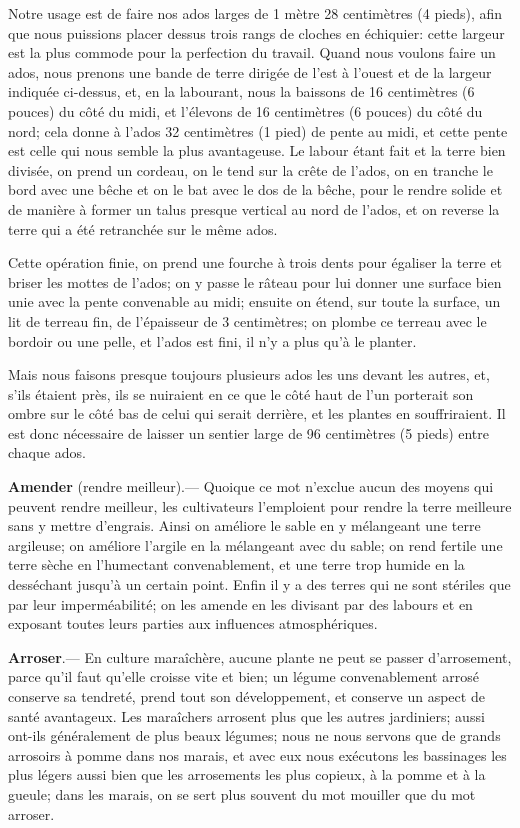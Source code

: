 \documentclass[10pt,a4paper]{book}
\begin{document}
Notre usage est de faire nos ados larges de 1 mètre 28 centimètres (4 pieds), afin que nous puissions placer dessus trois rangs de cloches en échiquier: cette largeur est la plus commode pour la perfection du travail. Quand nous voulons faire un ados, nous prenons une bande de terre dirigée de l'est à l'ouest et de la largeur indiquée ci-dessus, et, en la labourant, nous la baissons de 16 centimètres (6 pouces) du côté du midi, et l'élevons de 16 centimètres (6 pouces) du côté du nord; cela donne à l'ados 32 centimètres (1 pied) de pente au midi, et cette pente est celle qui nous semble la plus avantageuse. Le labour étant fait et la terre bien divisée, on prend un cordeau, on le tend sur la crête de l'ados, on en tranche le bord avec une bêche et on le bat avec le dos de la bêche, pour le rendre solide et de manière à former un talus presque vertical au nord de l'ados, et on reverse la terre qui a été retranchée sur le même ados.

Cette opération finie, on prend une fourche à trois dents pour égaliser la terre et briser les mottes de l'ados; on y passe le râteau pour lui donner une surface bien unie avec la pente convenable au midi; ensuite on étend, sur toute la surface, un lit de terreau fin, de l'épaisseur de 3 centimètres; on plombe ce terreau avec le bordoir ou une pelle, et l'ados est fini, il n'y a plus qu'à le planter.

Mais nous faisons presque toujours plusieurs ados les uns devant les autres, et, s'ils étaient près, ils se nuiraient en ce que le côté haut de l'un porterait son ombre sur le côté bas de celui qui serait derrière, et les plantes en souffriraient. Il est donc nécessaire de laisser un sentier large de 96 centimètres (5 pieds) entre chaque ados.

\textbf{Amender} (rendre meilleur).--- Quoique ce mot n'exclue aucun des moyens qui peuvent rendre meilleur, les cultivateurs l'emploient pour rendre la terre meilleure sans y mettre d'engrais. Ainsi on améliore le sable en y mélangeant une terre argileuse; on améliore l'argile en la mélangeant avec du sable; on rend fertile une terre sèche en l'humectant convenablement, et une terre trop humide en la desséchant jusqu'à un certain point. Enfin il y a des terres qui ne sont stériles que par leur imperméabilité; on les amende en les divisant par des labours et en exposant toutes leurs parties aux influences atmosphériques.

\textbf{Arroser}.--- En culture maraîchère, aucune plante ne peut se passer d'arrosement, parce qu'il faut qu'elle croisse vite et bien; un légume convenablement arrosé conserve sa tendreté, prend tout son développement, et conserve un aspect de santé avantageux. Les maraîchers arrosent plus que les autres jardiniers; aussi ont-ils généralement de plus beaux légumes; nous ne nous servons que de grands arrosoirs à pomme dans nos marais, et avec eux nous exécutons les bassinages les plus légers aussi bien que les arrosements les plus copieux, à la pomme et à la gueule; dans les marais, on se sert plus souvent du mot mouiller que du mot arroser.
\end{document}
